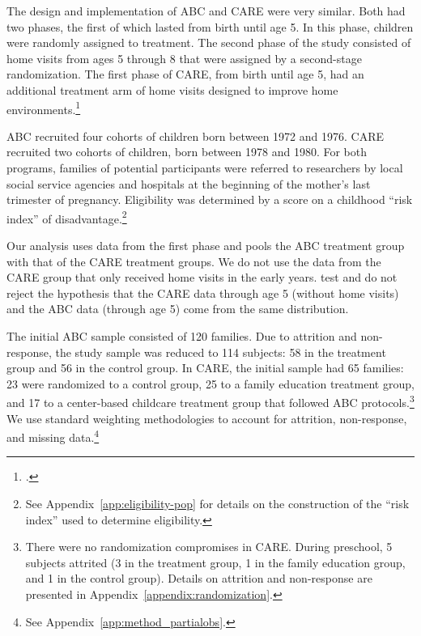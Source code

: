 The design and implementation of ABC and CARE were very similar. Both had two phases, the first of which lasted from birth until age 5. In this phase, children were randomly assigned to treatment. The second phase of the study consisted of home visits from ages 5 through 8 that were assigned by a second-stage randomization. The first phase of CARE, from birth until age 5, had an additional treatment arm of home visits designed to improve home environments.\footnote{\citet{Wasik_Ramey_etal_1990_CD}.}

ABC recruited four cohorts of children born between 1972 and 1976. CARE recruited two cohorts of children, born between 1978 and 1980. For both programs, families of potential participants were referred to researchers by local social service agencies and hospitals at the beginning of the mother's last trimester of pregnancy. Eligibility was determined by a score on a childhood ``risk index'' of disadvantage.\footnote{See  Appendix~\ref{app:eligibility-pop} for details on the construction of the ``risk index'' used to determine eligibility.}

Our analysis uses data from the first phase and pools the ABC treatment group with that of the CARE treatment groups. We do not use the data from the CARE group that only received home visits in the early years. \cite{Campbell_Conti_etal_2014_EarlyChildhoodInvestments} test and do not reject the hypothesis that the CARE data through age 5 (without home visits) and the ABC data (through age 5) come from the same distribution.

The initial ABC sample consisted of 120 families. Due to attrition and non-response, the study sample was reduced to 114 subjects: 58 in the treatment group and 56 in the control group. In CARE, the initial sample had 65 families: 23 were randomized to a control group, 25 to a family education treatment group, and 17 to a center-based childcare treatment group that followed ABC protocols.\footnote{There were no randomization compromises in CARE. During preschool, 5 subjects attrited (3 in the treatment group, 1 in the family education group, and 1 in the control group). Details on attrition and non-response are presented in Appendix~\ref{appendix:randomization}.} We use standard weighting methodologies to account for attrition, non-response, and missing data.\footnote{See Appendix~\ref{app:method_partialobs}.}

